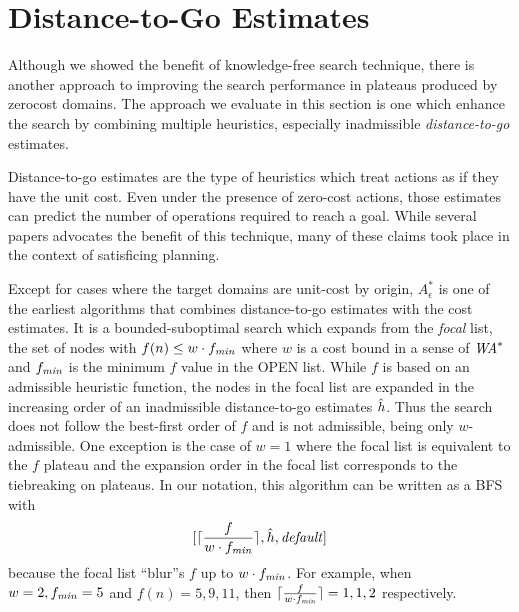\clearpage
\section{Distance-to-Go Estimates}

\label{sec:distance-to-go}

Although we showed the benefit of knowledge-free search technique, there is another approach to improving the
search performance in plateaus produced by zerocost domains. The approach we evaluate in this section is one which
enhance the search by combining multiple heuristics, especially inadmissible \emph{distance-to-go} estimates.



Distance-to-go estimates are the type of
heuristics which treat actions as if they have the unit cost. Even under
the presence of zero-cost actions, those estimates can predict the
number of operations required to reach a goal.
While several papers advocates the benefit of this technique, many of
these claims took place in the context of satisficing planning.

Except for cases where the target domains are unit-cost by origin, $A^*_\epsilon$ \cite{pearl1982studies} is one of
the earliest algorithms that combines distance-to-go estimates with the cost estimates. It is a bounded-suboptimal
search which expands from the \emph{focal} list, the set of nodes with $f(n)\leq w\cdot f_{\mit{min}}$ where $w$ is
a cost bound in a sense of $\mit{WA}^*$ and $f_{\mit{min}}$ is the minimum $f$ value in the OPEN list.  While $f$
is based on an admissible heuristic function, the nodes in the focal list are expanded in the increasing order of
an inadmissible distance-to-go estimates $\hh$. Thus the search does not follow the best-first order of $f$ and is
not admissible, being only $w$-admissible. One exception is the case of $w=1$ where the focal list is equivalent
to the $f$ plateau and the expansion order in the focal list corresponds to the tiebreaking on plateaus. In our
notation, this algorithm can be written as a BFS with
\[
 [ \lceil \frac{f}{w\cdot f_{\mit{min}}} \rceil, \hh, \mit{default}]
\]
because the focal list ``blur''s $f$ up to $w\cdot f_{\mit{min}}$. For example, when $w=2, f_{\mit{min}}=5$ and
$f(n)=5,9,11$, then $\lceil \frac{f}{w\cdot f_{\mit{min}}} \rceil=1,1,2$ respectively. 

